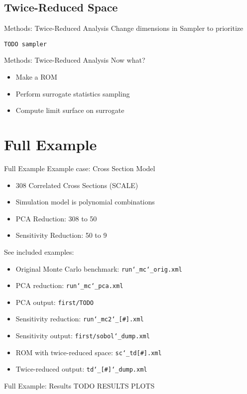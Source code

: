 \documentclass[t,9pt,svgnames]{beamer}
\newenvironment{codebox}{}{}
\newcommand{\code}[1]{\texttt{#1}}
\begin{document}
\subsection{Twice-Reduced Space}
\begin{frame}[fragile]{Methods: Twice-Reduced Analysis}
  Change dimensions in Sampler to prioritize
  \begin{codebox}
    \begin{lstlisting}[emph={indices}]
      TODO sampler
    \end{lstlisting}
  \end{codebox}
\end{frame}

\begin{frame}[fragile]{Methods: Twice-Reduced Analysis}
  Now what?
  \begin{itemize}
    \item Make a ROM
    \item Perform surrogate statistics sampling
    \item Compute limit surface on surrogate
  \end{itemize}
\end{frame}

\section{Full Example}
\begin{frame}[fragile]{Full Example}
  Example case: Cross Section Model
  \begin{itemize}
    \item 308 Correlated Cross Sections (SCALE)
    \item Simulation model is polynomial combinations
    \item PCA Reduction: 308 to 50
    \item Sensitivity Reduction: 50 to 9
  \end{itemize}
  See included examples:
  \begin{itemize}
    \item Original Monte Carlo benchmark: \code{run\char`_mc\char`_orig.xml}
    \item PCA reduction: \code{run\char`_mc\char`_pca.xml}
    \item PCA output: \code{first/TODO}
    \item Sensitivity reduction: \code{run\char`_mc2\char`_[\#].xml}
    \item Sensitivity output: \code{first/sobol\char`_dump.xml}
    \item ROM with twice-reduced space: \code{sc\char`_td[\#].xml}
    \item Twice-reduced output: \code{td\char`_[\#]\char`_dump.xml}
  \end{itemize}
\end{frame}

\begin{frame}[fragile]{Full Example: Results}
  TODO RESULTS PLOTS
\end{frame}
\end{document}
